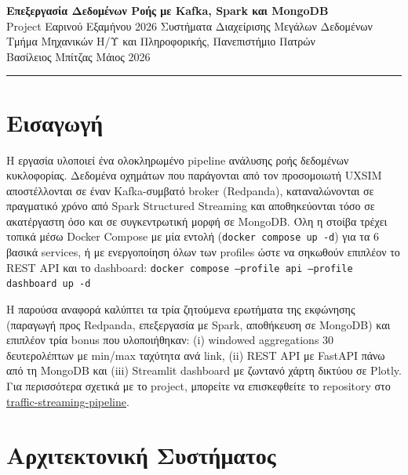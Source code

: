 \documentclass[11pt,a4paper]{article}
\newcommand{\code}[1]{\texttt{\small #1}}
\begin{document}
\begin{center}
   {\Large\bfseries Επεξεργασία Δεδομένων Ροής με Kafka, Spark και MongoDB}\\[4pt]
   {\small Project Εαρινού Εξαμήνου 2026 \textbar{} Συστήματα Διαχείρισης Μεγάλων Δεδομένων}\\[2pt]
   {\small Τμήμα Μηχανικών Η/Υ και Πληροφορικής, Πανεπιστήμιο Πατρών}\\[2pt]
   {\small Βασίλειος Μπίτζας \textbar{} Μάιος 2026}
\end{center}
\vspace{3pt}\hrule\vspace{6pt}

\section{Εισαγωγή}
Η εργασία υλοποιεί ένα ολοκληρωμένο pipeline ανάλυσης ροής δεδομένων κυκλοφορίας. Δεδομένα οχημάτων που παράγονται από τον προσομοιωτή UXSIM αποστέλλονται σε έναν Kafka-συμβατό broker (Redpanda), καταναλώνονται σε πραγματικό χρόνο από Spark Structured Streaming και αποθηκεύονται τόσο σε ακατέργαστη όσο και σε συγκεντρωτική μορφή σε MongoDB. Όλη η στοίβα τρέχει τοπικά μέσω Docker Compose με μία εντολή (\code{docker compose up -d}) για τα 6 βασικά services, ή με ενεργοποίηση όλων των profiles ώστε να σηκωθούν επιπλέον το REST API και το dashboard: \newline\code{docker compose --profile api --profile dashboard up -d}

Η παρούσα αναφορά καλύπτει τα τρία ζητούμενα ερωτήματα της εκφώνησης (παραγωγή προς Redpanda, επεξεργασία με Spark, αποθήκευση σε MongoDB) και επιπλέον τρία bonus που υλοποιήθηκαν: (i) windowed aggregations 30 δευτερολέπτων με min/max ταχύτητα ανά link, (ii) REST API με FastAPI πάνω από τη MongoDB και (iii) Streamlit dashboard με ζωντανό χάρτη δικτύου σε Plotly. Για περισσότερα σχετικά με το project, μπορείτε να επισκεφθείτε το repository στο \href{https://github.com/IBilba/traffic-streaming-pipeline}{traffic-streaming-pipeline}.

\section{Αρχιτεκτονική Συστήματος}
\end{document}
